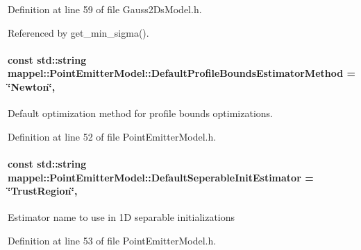 Definition at line 59 of file Gauss2\+Ds\+Model.\+h.



Referenced by get\+\_\+min\+\_\+sigma().

\paragraph[{\texorpdfstring{Default\+Profile\+Bounds\+Estimator\+Method}{DefaultProfileBoundsEstimatorMethod}}]{\setlength{\rightskip}{0pt plus 5cm}const std\+::string mappel\+::\+Point\+Emitter\+Model\+::\+Default\+Profile\+Bounds\+Estimator\+Method = \char`\"{}Newton\char`\"{}\hspace{0.3cm}{\ttfamily [static]}, {\ttfamily [inherited]}}\hypertarget{classmappel_1_1PointEmitterModel_a5240568f2d7c7bad84e900d283b299dc}{}\label{classmappel_1_1PointEmitterModel_a5240568f2d7c7bad84e900d283b299dc}


Default optimization method for profile bounds optimizations. 



Definition at line 52 of file Point\+Emitter\+Model.\+h.

\paragraph[{\texorpdfstring{Default\+Seperable\+Init\+Estimator}{DefaultSeperableInitEstimator}}]{\setlength{\rightskip}{0pt plus 5cm}const std\+::string mappel\+::\+Point\+Emitter\+Model\+::\+Default\+Seperable\+Init\+Estimator = \char`\"{}Trust\+Region\char`\"{}\hspace{0.3cm}{\ttfamily [static]}, {\ttfamily [inherited]}}\hypertarget{classmappel_1_1PointEmitterModel_ad8c3dc629d75d22f25855a5f1ba8729f}{}\label{classmappel_1_1PointEmitterModel_ad8c3dc629d75d22f25855a5f1ba8729f}
Estimator name to use in 1D separable initializations 

Definition at line 53 of file Point\+Emitter\+Model.\+h.



